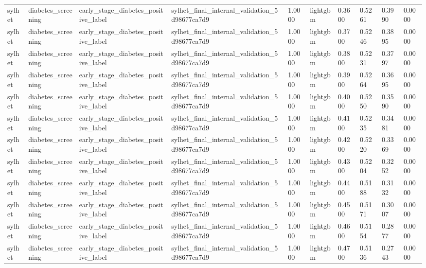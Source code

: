 \begin{tabular}{llllllllll}
sylhet & diabetes\_screening & early\_stage\_diabetes\_positive\_label & sylhet\_final\_internal\_validation\_5d98677ca7d9 & 1.0000 & lightgbm & 0.3600 & 0.5261 & 0.3990 & 0.0000 \\
sylhet & diabetes\_screening & early\_stage\_diabetes\_positive\_label & sylhet\_final\_internal\_validation\_5d98677ca7d9 & 1.0000 & lightgbm & 0.3700 & 0.5246 & 0.3895 & 0.0000 \\
sylhet & diabetes\_screening & early\_stage\_diabetes\_positive\_label & sylhet\_final\_internal\_validation\_5d98677ca7d9 & 1.0000 & lightgbm & 0.3800 & 0.5231 & 0.3797 & 0.0000 \\
sylhet & diabetes\_screening & early\_stage\_diabetes\_positive\_label & sylhet\_final\_internal\_validation\_5d98677ca7d9 & 1.0000 & lightgbm & 0.3900 & 0.5264 & 0.3695 & 0.0000 \\
sylhet & diabetes\_screening & early\_stage\_diabetes\_positive\_label & sylhet\_final\_internal\_validation\_5d98677ca7d9 & 1.0000 & lightgbm & 0.4000 & 0.5250 & 0.3590 & 0.0000 \\
sylhet & diabetes\_screening & early\_stage\_diabetes\_positive\_label & sylhet\_final\_internal\_validation\_5d98677ca7d9 & 1.0000 & lightgbm & 0.4100 & 0.5235 & 0.3481 & 0.0000 \\
sylhet & diabetes\_screening & early\_stage\_diabetes\_positive\_label & sylhet\_final\_internal\_validation\_5d98677ca7d9 & 1.0000 & lightgbm & 0.4200 & 0.5220 & 0.3369 & 0.0000 \\
sylhet & diabetes\_screening & early\_stage\_diabetes\_positive\_label & sylhet\_final\_internal\_validation\_5d98677ca7d9 & 1.0000 & lightgbm & 0.4300 & 0.5204 & 0.3252 & 0.0000 \\
sylhet & diabetes\_screening & early\_stage\_diabetes\_positive\_label & sylhet\_final\_internal\_validation\_5d98677ca7d9 & 1.0000 & lightgbm & 0.4400 & 0.5188 & 0.3132 & 0.0000 \\
sylhet & diabetes\_screening & early\_stage\_diabetes\_positive\_label & sylhet\_final\_internal\_validation\_5d98677ca7d9 & 1.0000 & lightgbm & 0.4500 & 0.5171 & 0.3007 & 0.0000 \\
sylhet & diabetes\_screening & early\_stage\_diabetes\_positive\_label & sylhet\_final\_internal\_validation\_5d98677ca7d9 & 1.0000 & lightgbm & 0.4600 & 0.5154 & 0.2877 & 0.0000 \\
sylhet & diabetes\_screening & early\_stage\_diabetes\_positive\_label & sylhet\_final\_internal\_validation\_5d98677ca7d9 & 1.0000 & lightgbm & 0.4700 & 0.5136 & 0.2743 & 0.0000 \\

\end{tabular}
